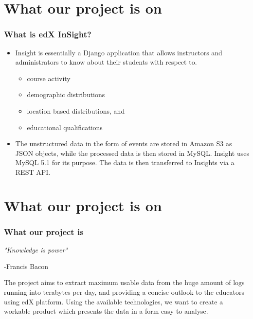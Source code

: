 \documentclass[12pt,xcolor=dvipsnames]{beamer}
\begin{document}
\section{What our project is on}
\begin{frame}[t]
\frametitle{What is edX InSight?}

\begin{itemize}

\item Insight is essentially a Django application that allows instructors and administrators to know about
their students with respect to.

\begin{itemize}
\item course activity
\item demographic distributions
\item location based distributions, and 
\item educational qualifications
\end{itemize}

\item The unstructured data in the form of events
are stored in Amazon S3 as JSON objects, while the processed data is then stored in MySQL. Insight
uses MySQL 5.1 for its purpose. The data is then transferred to Insights via a REST API.

\end{itemize}
\end{frame}

\section{What our project is on}
\begin{frame}[t]
\frametitle{What our project is}

\begin{center}
\textit{\large "Knowledge is power"}
\end{center}

\begin{flushright}
-Francis Bacon  
\end{flushright}

\hspace{20pt} The project aims to extract maximum usable data from the huge amount of logs running into terabytes per day, and providing a concise outlook to the educators using edX platform. Using the available technologies, we want to create a workable product which presents the data in a form easy to analyse. \\

\end{frame}
\end{document}
